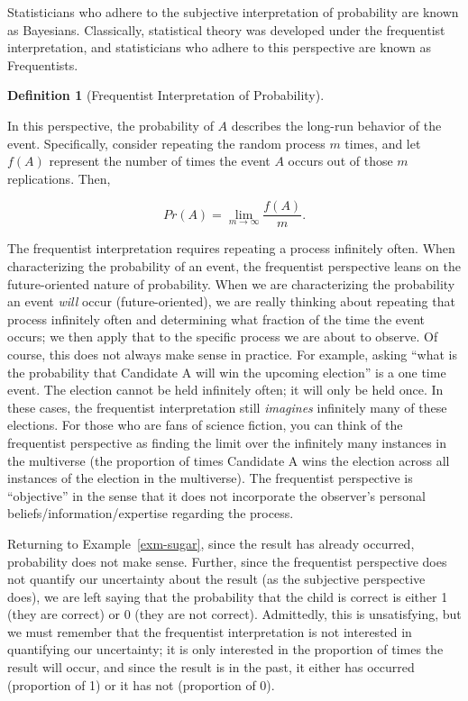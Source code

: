 \documentclass[
  letterpaper,
  DIV=11,
  numbers=noendperiod]{scrreprt}
\theoremstyle{definition}
\newtheorem{definition}{Definition}[chapter]
\theoremstyle{plain}
\theoremstyle{definition}
\theoremstyle{remark}
\begin{document}
Statisticians who adhere to the subjective interpretation of probability
are known as Bayesians. Classically, statistical theory was developed
under the frequentist interpretation, and statisticians who adhere to
this perspective are known as Frequentists.

\begin{definition}[Frequentist Interpretation of
Probability]\protect\hypertarget{def-frequentist-interpretation}{}\label{def-frequentist-interpretation}

In this perspective, the probability of \(A\) describes the long-run
behavior of the event. Specifically, consider repeating the random
process \(m\) times, and let \(f(A)\) represent the number of times the
event \(A\) occurs out of those \(m\) replications. Then,

\[Pr(A) = \lim_{m \rightarrow \infty} \frac{f(A)}{m}.\]

\end{definition}

The frequentist interpretation requires repeating a process infinitely
often. When characterizing the probability of an event, the frequentist
perspective leans on the future-oriented nature of probability. When we
are characterizing the probability an event \emph{will} occur
(future-oriented), we are really thinking about repeating that process
infinitely often and determining what fraction of the time the event
occurs; we then apply that to the specific process we are about to
observe. Of course, this does not always make sense in practice. For
example, asking ``what is the probability that Candidate A will win the
upcoming election'' is a one time event. The election cannot be held
infinitely often; it will only be held once. In these cases, the
frequentist interpretation still \emph{imagines} infinitely many of
these elections. For those who are fans of science fiction, you can
think of the frequentist perspective as finding the limit over the
infinitely many instances in the multiverse (the proportion of times
Candidate A wins the election across all instances of the election in
the multiverse). The frequentist perspective is ``objective'' in the
sense that it does not incorporate the observer's personal
beliefs/information/expertise regarding the process.

Returning to Example~\ref{exm-sugar}, since the result has already
occurred, probability does not make sense. Further, since the
frequentist perspective does not quantify our uncertainty about the
result (as the subjective perspective does), we are left saying that the
probability that the child is correct is either 1 (they are correct) or
0 (they are not correct). Admittedly, this is unsatisfying, but we must
remember that the frequentist interpretation is not interested in
quantifying our uncertainty; it is only interested in the proportion of
times the result will occur, and since the result is in the past, it
either has occurred (proportion of 1) or it has not (proportion of 0).
\end{document}

